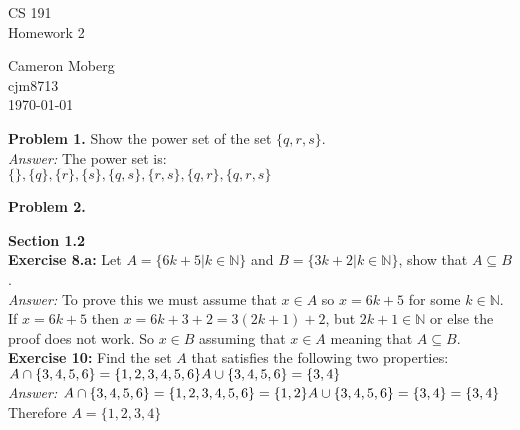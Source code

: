 \documentclass[12pt]{article}
\begin{document}
\begin{center}
\Large{CS 191\\}
\large{Homework 2\\}
\end{center}
\begin{flushright}
Cameron Moberg\\
cjm8713\\
\today\\
\end{flushright}

\textbf{Problem 1.}  Show the power set of the set $\{q,r,s\}$.\\
\textit{Answer:} The power set is: \\ 
$\{\},\{q\},\{r\},\{s\},\{q,s\},\{r,s\},\{q,r\},\{q,r,s\}$

\vspace{7mm}
\textbf{Problem 2.}



\textbf{Section 1.2}\\

\textbf{Exercise 8.a:} Let $A=\{6k+5 | k \in \mathbb{N}\}$ and $B=\{3k+2|k \in \mathbb{N}\}$, show that $A \subseteq B$.  \\ 
\textit {Answer:} To prove this we must assume that $x \in A$ so $x = 6k+5$ for some $k \in \mathbb{N}$. If $x=6k+5$ then $x=6k+3+2=3(2k+1)+2$, but $2k+1 \in \mathbb{N}$ or else the proof does not work. So $x \in B$ assuming that $x \in A$ meaning that $A \subseteq B$. \\

\textbf{Exercise 10:} Find the set $A$ that satisfies the following two properties: \\
$A \cap \{3,4,5,6\} = \{1,2,3,4,5,6\}\\
A \cup \{3,4,5,6\} = \{3,4\}$\\
\textit {Answer:} 
$A \cap \{3,4,5,6\} = \{1,2,3,4,5,6\} = \{1,2\} \\
A \cup \{3,4,5,6\} = \{3,4\} = \{3,4\}$\\
Therefore $A = \{1,2,3,4\}$\\
\end{document}
